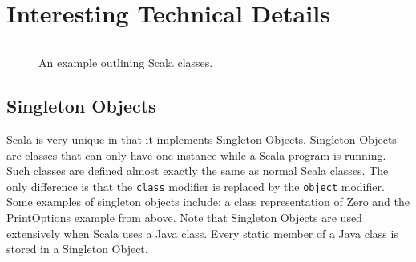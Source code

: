 \documentclass[jou,apacite]{IEEEtran}
\begin{document}
\section{Interesting Technical Details}
\label{sec:interesting-tech}

\begin{figure}
  
  \inputminted{Scala}{examples/nats.scala}
  \caption{An example outlining Scala classes.}
  \label{lst:nats-example}
\end{figure}

\subsection{Singleton Objects}
Scala is very unique in that it implements Singleton Objects. Singleton Objects are classes that can only have one instance while a Scala program is running. Such classes are defined almost exactly the same as normal Scala classes. The only difference is that the \texttt{class} modifier is replaced by the \texttt{object} modifier. Some examples of singleton objects include: a class representation of Zero and the PrintOptions example from above. Note that Singleton Objects are used extensively when Scala uses a Java class. Every static member of a Java class is stored in a Singleton Object.
\end{document}

